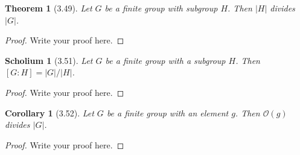 \documentclass{article}
\newtheorem*{thm}{Theorem}
\newtheorem*{cor}{Corollary}
\newtheorem{sch}{Scholium}
\begin{document}
\begin{thm}[3.49]
	Let $G$ be a finite group with subgroup $H$. Then $|H|$ divides $|G|$.
\end{thm}
\begin{proof}
    Write your proof here.
\end{proof}

\begin{sch}[3.51]
	Let $G$ be a finite group with a subgroup $H$. Then $[G : H] = |G|/|H|$.
\end{sch}
\begin{proof}
    Write your proof here.
\end{proof}

\begin{cor}[3.52]
  Let $G$ be a finite group with an element $g$. Then $\mathcal{O}(g)$ divides $|G|$. 
\end{cor}
\begin{proof}
    Write your proof here.
\end{proof}
\end{document}
